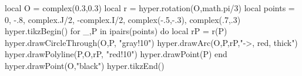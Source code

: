 \documentclass[margin=.2cm,multi,tikz]{standalone}
\begin{document}
\begin{luacode*}
local O = complex(0.3,0.3)
local r = hyper.rotation(O,math.pi/3)
local points = {0, -.8, complex.J/2, -complex.I/2, complex(-.5,-.3), complex(.7,.3)}
hyper.tikzBegin()
for _,P in ipairs(points) do
	local rP = r(P)
	hyper.drawCircleThrough(O,P, "gray!10")
	hyper.drawArc(O,P,rP,"->, red, thick")
	hyper.drawPolyline(P,O,rP, "red!10")
	hyper.drawPoint(P)
end
hyper.drawPoint(O,"black")
hyper.tikzEnd()
\end{luacode*}
\end{document}

